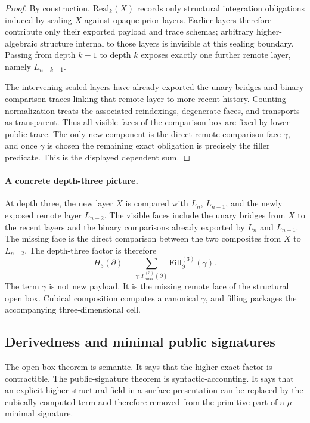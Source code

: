 \begin{proof}
By construction, \(\mathrm{Real}_k(X)\) records only structural integration obligations induced
by sealing \(X\) against opaque prior layers.  Earlier layers therefore contribute only their
exported payload and trace schemas; arbitrary higher-algebraic structure internal to those
layers is invisible at this sealing boundary.  Passing from depth \(k-1\) to depth \(k\)
exposes exactly one further remote layer, namely \(L_{n-k+1}\).

The intervening sealed layers have already exported the unary bridges and binary comparison
traces linking that remote layer to more recent history.  Counting normalization treats the
associated reindexings, degenerate faces, and transports as transparent.  Thus all visible
faces of the comparison box are fixed by lower public trace.  The only new component is the
direct remote comparison face \(\gamma\), and once \(\gamma\) is chosen the remaining exact
obligation is precisely the filler predicate.  This is the displayed dependent sum.
\end{proof}

\paragraph{A concrete depth-three picture.}
At depth three, the new layer \(X\) is compared with \(L_n\), \(L_{n-1}\), and the newly
exposed remote layer \(L_{n-2}\).  The visible faces include the unary bridges from \(X\) to
the recent layers and the binary comparisons already exported by \(L_n\) and \(L_{n-1}\).
The missing face is the direct comparison between the two composites from \(X\) to
\(L_{n-2}\).  The depth-three factor is therefore
\[
  H_3(\partial)
  =
  \sum_{\gamma:\Gamma_{\mathrm{miss}}^{(3)}(\partial)}
  \mathrm{Fill}^{(3)}_{\partial}(\gamma).
\]
The term \(\gamma\) is not new payload.  It is the missing remote face of the structural open
box.  Cubical composition computes a canonical \(\gamma\), and filling packages the
accompanying three-dimensional cell.

\subsection{Derivedness and minimal public signatures}
\label{subsec:derivedness-minimal-signatures}

The open-box theorem is semantic.  It says that the higher exact factor is contractible.  The
public-signature theorem is syntactic-accounting.  It says that an explicit higher structural
field in a surface presentation can be replaced by the cubically computed term and therefore
removed from the primitive part of a \(\mu\)-minimal signature.

